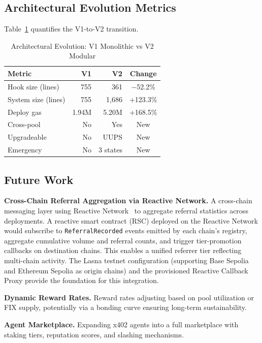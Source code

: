 \documentclass[conference]{IEEEtran}
\begin{document}
\subsection{Architectural Evolution Metrics}

Table~\ref{tab:evolution} quantifies the V1-to-V2 transition.

\begin{table}[t]
\caption{Architectural Evolution: V1 Monolithic vs V2 Modular}
\label{tab:evolution}
\centering
\begin{tabular}{lrrc}
\toprule
\textbf{Metric} & \textbf{V1} & \textbf{V2} & \textbf{Change} \\
\midrule
Hook size (lines) & 755 & 361 & $-$52.2\% \\
System size (lines) & 755 & 1,686 & +123.3\% \\
Deploy gas & 1.94M & 5.20M & +168.5\% \\
Cross-pool & No & Yes & New \\
Upgradeable & No & UUPS & New \\
Emergency & No & 3 states & New \\
\bottomrule
\end{tabular}
\end{table}

\subsection{Future Work}

\textbf{Cross-Chain Referral Aggregation via Reactive Network.} A cross-chain messaging layer using Reactive Network~\cite{reactivenetwork} to aggregate referral statistics across deployments. A reactive smart contract (RSC) deployed on the Reactive Network would subscribe to \texttt{ReferralRecorded} events emitted by each chain's registry, aggregate cumulative volume and referral counts, and trigger tier-promotion callbacks on destination chains. This enables a unified referrer tier reflecting multi-chain activity. The Lasna testnet configuration (supporting Base Sepolia and Ethereum Sepolia as origin chains) and the provisioned Reactive Callback Proxy provide the foundation for this integration.

\textbf{Dynamic Reward Rates.} Reward rates adjusting based on pool utilization or FIX supply, potentially via a bonding curve ensuring long-term sustainability.

\textbf{Agent Marketplace.} Expanding x402 agents into a full marketplace with staking tiers, reputation scores, and slashing mechanisms.
\end{document}
